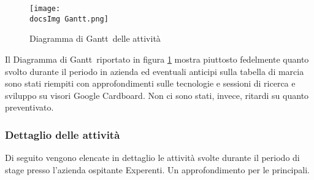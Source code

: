 \begin{figure}[H]
	\centering
	\texttt{[image: \\docsImg Gantt.png]}
	\caption{Diagramma di Gantt\gloss\ delle attivit\`a}
	\label{fig:Diagramma di Gantt delle attivita}
\end{figure}

Il Diagramma di Gantt\gloss\ riportato in figura \ref{fig:Diagramma di Gantt delle attivita} mostra piuttosto fedelmente quanto svolto durante il periodo in azienda ed eventuali anticipi sulla tabella di marcia sono stati riempiti con approfondimenti sulle tecnologie e sessioni di ricerca e sviluppo su visori Google Cardboard. Non ci sono stati, invece, ritardi su quanto preventivato.

\subsubsection{Dettaglio delle attivit\`a}
Di seguito vengono elencate in dettaglio le attivit\`a svolte durante il periodo di stage presso l'azienda ospitante Experenti. Un approfondimento per le principali. 

